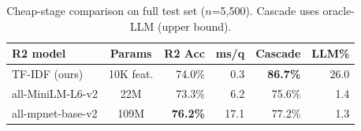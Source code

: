 \documentclass[11pt,a4paper]{article}
\begin{document}
\begin{table}[h]
\centering
\small
\caption{Cheap-stage comparison on full test set ($n$=5,500). Cascade uses oracle-LLM (upper bound).}
\label{tab:cheapstage}
\begin{tabular}{@{}lcrrrr@{}}
\toprule
\textbf{R2 model} & \textbf{Params} & \textbf{R2 Acc} & \textbf{ms/q} & \textbf{Cascade} & \textbf{LLM\%} \\
\midrule
TF-IDF (ours) & 10K feat. & 74.0\% & 0.3 & \textbf{86.7\%} & 26.0 \\
all-MiniLM-L6-v2 & 22M & 73.3\% & 6.2 & 75.6\% & 1.4 \\
all-mpnet-base-v2 & 109M & \textbf{76.2\%} & 17.1 & 77.2\% & 1.3 \\
\bottomrule
\end{tabular}
\end{table}
\end{document}
